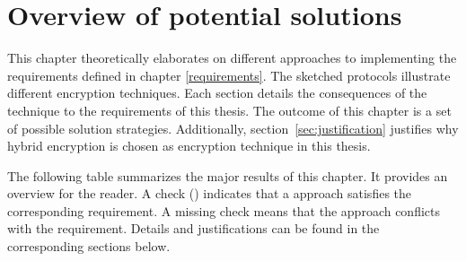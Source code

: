 \documentclass[../main.tex]{subfiles}
\begin{document}
\chapter{Overview of potential solutions}
\label{chap:overview}

This chapter theoretically elaborates on different approaches to implementing the requirements defined in chapter \ref{requirements}.
The sketched protocols illustrate different encryption techniques.
Each section details the consequences of the technique to the requirements of this thesis.
The outcome of this chapter is a set of possible solution strategies.
Additionally, section~\ref{sec:justification} justifies why hybrid encryption is chosen as encryption technique in this thesis.

The following table summarizes the major results of this chapter.
It provides an overview for the reader.
A check (\checkmark) indicates that a approach satisfies the corresponding requirement.
A missing check means that the approach conflicts with the requirement.
Details and justifications can be found in the corresponding sections below.
\end{document}
